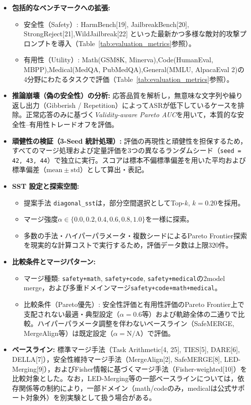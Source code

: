 \documentclass{article}
\begin{document}
\begin{itemize}
    \item \textbf{包括的なベンチマークへの拡張:}
    \begin{itemize}
        \item 安全性（Safety）:
        HarmBench[19], JailbreakBench[20], StrongReject[21],WildJailbreak[22] といった最新かつ多様な敵対的攻撃プロンプトを導入（Table~\ref{tab:evaluation_metrics}参照）。
        \item 有用性（Utility）:
        Math(GSM8K, Minerva),Code(HumanEval, MBPP),Medical(MedQA, PubMedQA),General(MMLU, AlpacaEval 2)の4分野にわたるタスクで評価（Table~\ref{tab:evaluation_metrics}参照）。
    \end{itemize}
    \item \textbf{推論崩壊（偽の安全性）の分析:}
    応答品質を解析し，無意味な文字列や繰り返し出力（Gibberish / Repetition）によってASRが低下しているケースを排除。正常応答のみに基づく\textit{Validity-aware Pareto AUC}を用いて，本質的な安全性--有用性トレードオフを評価。
    \item \textbf{頑健性の検証（3-Seed 統計処理）:}
    評価の再現性と頑健性を担保するため，すべてのマージ処理および定量評価を3つの異なるランダムシード（\texttt{seed = 42, 43, 44}）で独立に実行。スコアは標本不偏標準偏差を用いた平均および標準偏差（$\mathrm{mean} \pm \mathrm{std}$）として算出・表記。
    \item \textbf{SST 設定と探索空間:}
    \begin{itemize}
        \item 提案手法 \texttt{diagonal\_sst}は，部分空間選択としてTop-$k$, $k=0.20$を採用。
        \item マージ強度$\alpha \in \{0.0, 0.2, 0.4, 0.6, 0.8, 1.0\}$を一様に探索。
        \item 多数の手法・ハイパーパラメータ・複数シードによるPareto Frontier探索を現実的な計算コストで実行するため，評価データ数は上限320件。
    \end{itemize}
    \item \textbf{比較条件とマージパターン:}
    \begin{itemize}
        \item マージ種類:
        \texttt{safety+math},
        \texttt{safety+code},
        \texttt{safety+medical}の2model merge，および多重ドメインマージ\texttt{safety+code+math+medical}。
        \item 比較条件（Pareto優先）:
        安全性評価と有用性評価のPareto Frontier上で支配されない最適・典型設定（$\alpha=0.6$等）および軌跡全体の二通りで比較。ハイパーパラメータ調整を伴わないベースライン（SafeMERGE, MergeAlign等）は既定設定（$\alpha=\mathrm{N/A}$）で評価。
    \end{itemize}
    \item \textbf{ベースライン:}
    標準マージ手法（Task Arithmetic[4, 25], TIES[5], DARE[6], DELLA[7]），安全性維持マージ手法（MergeAlign[2], SafeMERGE[8], LED-Merging[9]），およびFisher情報に基づくマージ手法（Fisher-weighted[10]）を比較対象とした。なお，LED-Merging等の一部ベースラインについては，依存関係等の制約により，一部ドメイン（math/codeのみ，medicalは公式サポート対象外）を別実験として扱う場合がある。
\end{itemize}
\end{document}
